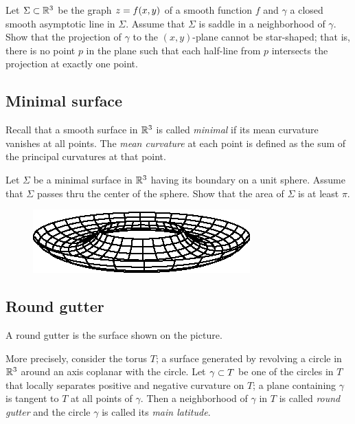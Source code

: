 \begin{pr}
Let $\Sigma\subset \mathbb{R}^3$ be the graph $z\z=f(x,y)$
of a smooth function $f$ 
and $\gamma$ a closed smooth asymptotic line in $\Sigma$.
Assume that $\Sigma$ is saddle in a neighborhood of $\gamma$.
Show that the projection of $\gamma$ to the $(x, y)$-plane cannot be star-shaped;
that is, there is no point $p$ in the plane such that each half-line from $p$ intersects the projection at exactly one point.
\end{pr}

\subsection*{Minimal surface}
\label{min-surf}

Recall that a smooth surface in $\mathbb{R}^3$ is called \emph{minimal} if its mean curvature vanishes at all points.
The \emph{mean curvature} at each point is defined as the sum of the principal curvatures at that point.

\begin{pr}
Let $\Sigma$ be a minimal surface in $\mathbb{R}^3$ having its boundary on a unit sphere.
Assume that $\Sigma$ passes thru the center of the sphere.
Show that the area of $\Sigma$ is at least $\pi$.
\end{pr}

{

\begin{figure}
\vskip-4mm
\centering
\includegraphics{asy/gutter}
\end{figure}

\subsection*{Round gutter\hard}
\label{half-torus}

A round gutter is the surface shown on the picture.

}

More precisely, consider the torus $T$; a surface generated by revolving a circle in $\mathbb{R}^3$ around an axis coplanar with the circle.
Let $\gamma\z\subset T$ be one of the circles in $T$ that locally separates positive and negative curvature on $T$;
a plane containing $\gamma$ is tangent to $T$ at all points of $\gamma$.
Then a neighborhood of $\gamma$ in $T$ is called 
\emph{round gutter}
and the circle $\gamma$ is called its {}\emph{main latitude}.



